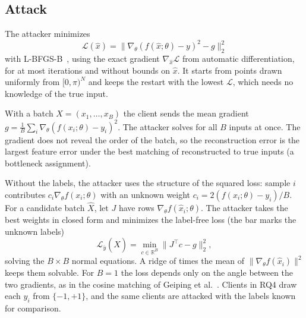 \documentclass[10pt,conference]{IEEEtran}
\begin{document}
\subsection{Attack}
The attacker minimizes
\[
  \mathcal L(\hat x) = \big\|\nabla_\theta (f(\hat x;\theta) - y)^2 - g\big\|_2^2
\]
with L-BFGS-B~\cite{byrd1995}, using the exact gradient $\nabla_{\hat x}\mathcal L$ from automatic
differentiation, for at most \MaxIter{} iterations and without bounds on $\hat x$. It starts from \Restarts{} points drawn
uniformly from $[0,\pi)^N$ and keeps the restart with the lowest $\mathcal L$, which needs no
knowledge of the true input.

With a batch $X = (x_1,\dots,x_B)$ the client sends the mean gradient
$g = \frac1B\sum_i \nabla_\theta(f(x_i;\theta) - y_i)^2$. The attacker solves for all $B$ inputs
at once. The gradient does not reveal the order of the batch, so the reconstruction error is the
largest feature error under the best matching of reconstructed to true inputs (a bottleneck
assignment).

Without the labels, the attacker uses the structure of the squared loss: sample $i$ contributes
$c_i\nabla_\theta f(x_i;\theta)$ with an unknown weight $c_i = 2(f(x_i;\theta) - y_i)/B$. For a
candidate batch $\hat X$, let $J$ have rows $\nabla_\theta f(\hat x_i;\theta)$. The attacker takes
the best weights in closed form and minimizes the label-free loss (the bar marks the unknown
labels)
\[
  \mathcal L_{\bar y}(\hat X) = \min_{c\in\mathbb R^B} \big\|J^\top c - g\big\|_2^2,
\]
solving the $B\times B$ normal equations. A ridge of \RidgeScale{} times the mean of
$\|\nabla_\theta f(\hat x_i)\|^2$ keeps them solvable. For $B = 1$ the loss depends only on the
angle between the two gradients, as in the cosine matching of Geiping et al.~\cite{geiping2020}.
Clients in RQ4 draw each $y_i$ from $\{-1, +1\}$, and the same clients are attacked with the
labels known for comparison.
\end{document}
